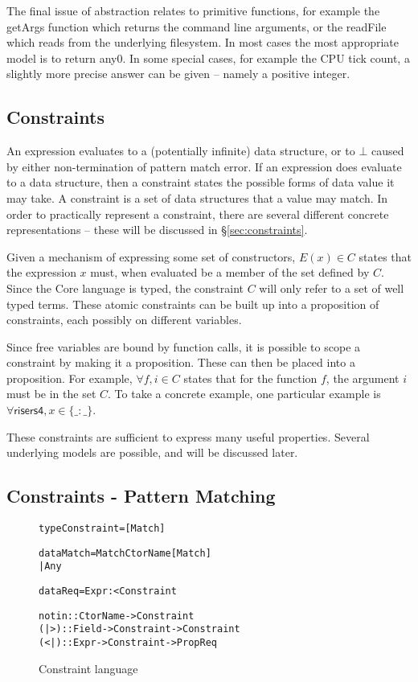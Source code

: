 \documentclass[preprint]{sigplanconf}
\newcommand{\C}[1]{\textsf{#1}}
\newenvironment{code}{\begin{alltt}\small}{\end{alltt}}
\newcommand{\g}[1]{\{#1\}} %
\begin{document}
The final issue of abstraction relates to primitive functions, for example the \C{getArgs} function which returns the command line arguments, or the \C{readFile} which reads from the underlying filesystem. In most cases the most appropriate model is to return \C{any0}. In some special cases, for example the CPU tick count, a slightly more precise answer can be given -- namely a positive integer.


\subsection{Constraints}

An expression evaluates to a (potentially infinite) data structure, or to $\bot{}$ caused by either non-termination of pattern match error. If an expression does evaluate to a data structure, then a constraint states the possible forms of data value it may take. A constraint is a set of data structures that a value may match. In order to practically represent a constraint, there are several different concrete representations -- these will be discussed in \S\ref{sec:constraints}.

Given a mechanism of expressing some set of constructors, $E(x) \in C$ states that the expression $x$ must, when evaluated be a member of the set defined by $C$. Since the Core language is typed, the constraint $C$ will only refer to a set of well typed terms. These atomic constraints can be built up into a proposition of constraints, each possibly on different variables.

Since free variables are bound by function calls, it is possible to scope a constraint by making it a proposition. These can then be placed into a proposition. For example, $\forall f, i \in C$ states that for the function $f$, the argument $i$ must be in the set $C$. To take a concrete example, one particular example is $\forall \C{risers4}, x \in \g{\_ : \_}$.

These constraints are sufficient to express many useful properties. Several underlying models are possible, and will be discussed later.

\subsection{Constraints - Pattern Matching}

\begin{figure}
\begin{code}
type Constraint = [Match]

data Match  =  Match CtorName [Match]
            |  Any

data Req = Expr :< Constraint

notin :: CtorName -> Constraint
(|>) :: Field -> Constraint -> Constraint
(<|) :: Expr -> Constraint -> Prop Req
\end{code}
\caption{Constraint language}
\label{fig:constraint}
\end{figure}
\end{document}
